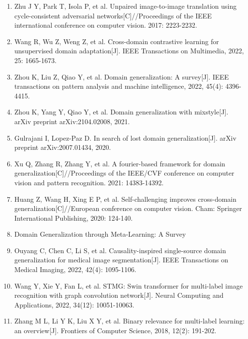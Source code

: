 \begin{enumerate}
\item
  \protect{}\label{_Ref213949490}{}Zhu J Y, Park T, Isola P, et al. Unpaired image-to-image translation using cycle-consistent adversarial networks{[}C{]}//Proceedings of the IEEE international conference on computer vision. 2017: 2223-2232.
\item
  \protect{}\label{_Ref213949530}{}Wang R, Wu Z, Weng Z, et al. Cross-domain contrastive learning for unsupervised domain adaptation{[}J{]}. IEEE Transactions on Multimedia, 2022, 25: 1665-1673.
\item
  \protect{}\label{_Ref213949554}{}Zhou K, Liu Z, Qiao Y, et al. Domain generalization: A survey{[}J{]}. IEEE transactions on pattern analysis and machine intelligence, 2022, 45(4): 4396-4415.
\item
  \protect{}\label{_Ref213949562}{}Zhou K, Yang Y, Qiao Y, et al. Domain generalization with mixstyle{[}J{]}. arXiv preprint arXiv:2104.02008, 2021.
\item
  \protect{}\label{_Ref213949607}{}Gulrajani I, Lopez-Paz D. In search of lost domain generalization{[}J{]}. arXiv preprint arXiv:2007.01434, 2020.
\item
  \protect{}\label{_Ref213949788}{}Xu Q, Zhang R, Zhang Y, et al. A fourier-based framework for domain generalization{[}C{]}//Proceedings of the IEEE/CVF conference on computer vision and pattern recognition. 2021: 14383-14392.
\item
  \protect{}\label{_Ref213949796}{}Huang Z, Wang H, Xing E P, et al. Self-challenging improves cross-domain generalization{[}C{]}//European conference on computer vision. Cham: Springer International Publishing, 2020: 124-140.
\item
  \protect{}\label{_Ref213949803}{}Domain Generalization through Meta-Learning: A Survey
\item
  \protect{}\label{_Ref213949863}{}Ouyang C, Chen C, Li S, et al. Causality-inspired single-source domain generalization for medical image segmentation{[}J{]}. IEEE Transactions on Medical Imaging, 2022, 42(4): 1095-1106.
\item
  \protect{}\label{_Ref213949872}{}Wang Y, Xie Y, Fan L, et al. STMG: Swin transformer for multi-label image recognition with graph convolution network{[}J{]}. Neural Computing and Applications, 2022, 34(12): 10051-10063.
\item
  \protect{}\label{_Ref213949896}{}Zhang M L, Li Y K, Liu X Y, et al. Binary relevance for multi-label learning: an overview{[}J{]}. Frontiers of Computer Science, 2018, 12(2): 191-202.

\end{enumerate}
